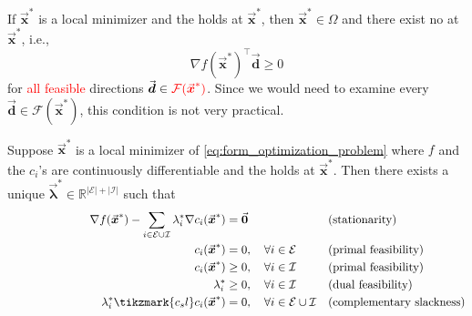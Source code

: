 \documentclass[9pt, headings=standardclasses, parskip=half]{scrartcl}
\newcommand{\vect}[1]{\vec{\boldsymbol{#1}}}
\newcommand{\R}{\mathbb{R}}
\begin{document}
\begin{lemma}\label{lem:fundamental_condition}
  If \(\vect{x}^{\ast}\) is a local minimizer and the  holds at \(\vect{x}^{\ast}\), then \(\vect{x}^{\ast} \in \Omega\) and there exist no  at $\vect{x}^*$, i.e.,
  \[
    \nabla f(\vect{x}^{\ast})^{\top} \vect{d} \ge 0
  \]
  for \textcolor{red}{all feasible} directions \(\vect{d}\in\textcolor{red}{\mathcal{F}(\vect{x}^{\ast})}\).
  Since we would need to examine every \(\vect{d}\in\mathcal{F}(\vect{x}^{\ast})\), this condition is not very practical.
\end{lemma}

\begin{theorem}\label{thm:KKT}
Suppose \(\vect{x}^{\ast}\) is a local minimizer of \eqref{eq:form_optimization_problem} where \(f\) and the \(c_i\)'s are continuously differentiable and the  holds at \(\vect{x}^{\ast}\). 
Then there exists a unique \(\vect{\lambda}^{\ast}\in\R^{|\mathcal{E}|+|\mathcal{I}|}\) such that
\begin{subequations}\label{eq:KKT}
  \begin{align}
    &\qquad\qquad\qquad&\nabla f(\vect{x}^{\ast}) - \sum_{i\in\mathcal{E}\cup\mathcal{I}} \lambda_{i}^{\ast} \nabla c_{i}(\vect{x}^{\ast}) &= \vect{0}   &&\text{(stationarity)} \label{eq:KKT_stationarity} \\ %
    &\qquad\qquad\qquad&c_{i}(\vect{x}^{\ast}) &= 0,                                            \quad \forall i\in\mathcal{E}                             &&\text{(primal feasibility)}                \label{eq:KKT_equal_feas} \\
    &\qquad\qquad\qquad&c_{i}(\vect{x}^{\ast}) &\ge 0,                                          \quad \forall i\in\mathcal{I}                             &&\text{(primal feasibility)}                \label{eq:KKT_inequal_feas} \\
    &\qquad\qquad\qquad&\lambda_{i}^{\ast} &\ge 0,                                              \quad \forall i\in\mathcal{I}                             &&\text{(dual feasibility)}                  \label{eq:KKT_dual_feas} \\
    &\qquad\qquad\qquad&\lambda_{i}^{\ast} \tikzmark{c_sl}c_{i}(\vect{x}^{\ast}) &= 0,   \quad \forall i\in\mathcal{E}\cup\mathcal{I}              &&\text{(complementary slackness)}           \label{eq:KKT_comp_slack} %

\end{align}
\end{subequations}
\end{theorem}
\end{document}
